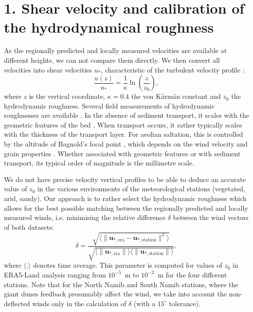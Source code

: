 \section*{1. Shear velocity and calibration of the hydrodynamical roughness}
\label{calib_z0}

As the regionally predicted and locally measured velocities are available at different heights, we can not compare them directly. We then convert all velocities into shear velocities $u_{*}$, characteristic of the turbulent velocity profile \citep{Spalding1961, Stull1988}:
%
\begin{equation}
\frac{u(z)}{u_{*}} = \frac{1}{\kappa}\ln\left(\frac{z}{z_{0}}\right),
\end{equation}
%
where $z$ is the vertical coordinate, $\kappa = 0.4$ the von K\'arm\'an constant and $z_{0}$ the hydrodynamic roughness. Several field measurements of hydrodynamic roughnesses are available . In the absence of sediment transport, it scales with the geometric features of the bed \citep{Pelletier2016} . When transport occurs, it rather typically scales with the thickness of the transport layer. For aeolian saltation, this is controlled by the altitude of Bagnold's focal point \citep{Duran2011,Valance2015}, which depends on the wind velocity and grain properties \citep{Sherman2008, Zhang2016, Field2018}. Whether associated with geometric features or with sediment transport, its typical order of magnitude is the millimetre scale.

We do not have precise velocity vertical profiles to be able to deduce an accurate value of $z_0$ in the various environments of the meteorological stations (vegetated, arid, sandy). Our approach is to rather select the hydrodynamic roughness which allows for the best possible matching between the regionally predicted and locally measured winds, i.e. minimising the relative difference $\delta$ between the wind vectors of both datasets:
%
\begin{equation}
\label{metric_roughness}
\delta = \frac{\sqrt{\langle\| \boldsymbol{u}_{*, \textrm{era}} - \boldsymbol{u}_{*, \textrm{station}} \|^{2}\rangle}}{\sqrt{ \langle \| \boldsymbol{u}_{*, \textrm{era}} \| \rangle \langle \| \boldsymbol{u}_{*, \textrm{station}} \| \rangle}} ,
\end{equation}
%
where $\langle.\rangle$ denotes time average. This parameter is computed for values of $z_0$ in ERA5-Land analysis ranging from $10^{-5}$~m to $10^{-2}$~m for the four different stations. Note that for the North Namib and South Namib stations, where the giant dunes feedback presumably affect the wind, we take into account the non-deflected winds only in the calculation of $\delta$ (with a $15^\circ$ tolerance).

